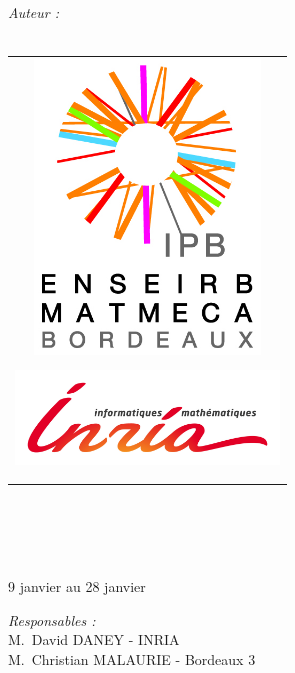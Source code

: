 \begin{titlepage}
\begin{flushleft} 
  \large
  \emph{Auteur :}\\
  \reportauthor\\
\end{flushleft}
\begin{center}
  
  \begin{center}
    \begin{tabular}{c}
      \\
      \includegraphics [width=60mm]{Images/ENSEIRB-MATMECA.jpg} \\
      \\
      \includegraphics [width=70mm]{Images/logo-INRIA.jpg}\\
      \\
      \\
    \end{tabular}

    \HRule \\[0.4cm]
           {\huge \bfseries \reporttitle}\\[0.4cm]
           \HRule \\[1.5cm]
    \textsc{\Large \reportsubject}\\[0.5cm]
           {\large 9 janvier au 28 janvier}\\              
\end{center}
\begin{flushbottom}
\begin{flushright} 
  \large
  \emph{Responsables :} \\
  M.~David DANEY - \small{INRIA} \\
  M.~Christian MALAURIE - \small{Bordeaux 3}
\end{flushright}
\end{flushbottom}
\end{center}
\end{titlepage}
